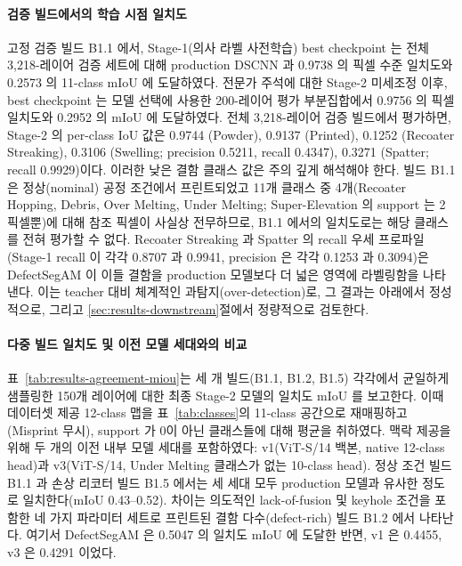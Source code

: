 \paragraph{검증 빌드에서의 학습 시점 일치도}
고정 검증 빌드 B1.1 에서, Stage-1(의사 라벨 사전학습) best checkpoint 는
전체 3{,}218-레이어 검증 세트에 대해 production DSCNN 과 0.9738 의 픽셀
수준 일치도와 0.2573 의 11-class mIoU 에 도달하였다. 전문가 주석에 대한
Stage-2 미세조정 이후, best checkpoint 는 모델 선택에 사용한 200-레이어
평가 부분집합에서 0.9756 의 픽셀 일치도와 0.2952 의 mIoU 에 도달하였다.
전체 3{,}218-레이어 검증 빌드에서 평가하면, Stage-2 의 per-class IoU 값은
0.9744 (Powder), 0.9137 (Printed), 0.1252 (Recoater Streaking), 0.3106
(Swelling; precision 0.5211, recall 0.4347), 0.3271 (Spatter; recall
0.9929)이다. 이러한 낮은 결함 클래스 값은 주의 깊게 해석해야 한다. 빌드
B1.1 은 정상(nominal) 공정 조건에서 프린트되었고 11개 클래스 중
4개(Recoater Hopping, Debris, Over Melting, Under Melting;
Super-Elevation 의 support 는 2 픽셀뿐)에 대해 참조 픽셀이 사실상
전무하므로, B1.1 에서의 일치도로는 해당 클래스를 전혀 평가할 수 없다.
Recoater Streaking 과 Spatter 의 recall 우세 프로파일(Stage-1 recall 이
각각 0.8707 과 0.9941, precision 은 각각 0.1253 과 0.3094)은 DefectSegAM
이 이들 결함을 production 모델보다 더 넓은 영역에 라벨링함을 나타낸다.
이는 teacher 대비 체계적인 과탐지(over-detection)로, 그 결과는 아래에서
정성적으로, 그리고 \ref{sec:results-downstream}절에서 정량적으로 검토한다.

\paragraph{다중 빌드 일치도 및 이전 모델 세대와의 비교}
표~\ref{tab:results-agreement-miou}는 세 개 빌드(B1.1, B1.2, B1.5)
각각에서 균일하게 샘플링한 150개 레이어에 대한 최종 Stage-2 모델의 일치도
mIoU 를 보고한다. 이때 데이터셋 제공 12-class 맵을 표~\ref{tab:classes}의
11-class 공간으로 재매핑하고(Misprint 무시), support 가 0이 아닌 클래스들에
대해 평균을 취하였다. 맥락 제공을 위해 두 개의 이전 내부 모델 세대를
포함하였다: v1(ViT-S/14 백본, native 12-class head)과 v3(ViT-S/14, Under
Melting 클래스가 없는 10-class head). 정상 조건 빌드 B1.1 과 손상 리코터
빌드 B1.5 에서는 세 세대 모두 production 모델과 유사한 정도로
일치한다(mIoU 0.43--0.52). 차이는 의도적인 lack-of-fusion 및 keyhole
조건을 포함한 네 가지 파라미터 세트로 프린트된 결함 다수(defect-rich)
빌드 B1.2 에서 나타난다. 여기서 DefectSegAM 은 0.5047 의 일치도 mIoU 에
도달한 반면, v1 은 0.4455, v3 은 0.4291 이었다.

